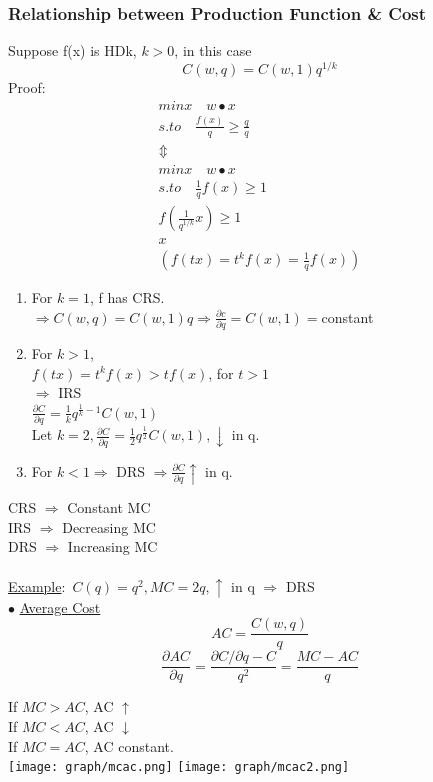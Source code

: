 \documentclass[letterpaper,13pt,single,pdftex]{scrartcl}
\begin{document}
\subsubsection{Relationship between Production Function \& Cost}
Suppose f(x) is HDk, $k>0$, in this case
\[C(w,q) = C(w,1)q^{1/k}\]
Proof:
\begin{gather*}
    min\limits{x}  \quad w\bullet x \\
    s.to\quad \frac{f(x)}{q} \ge \frac{q}{q}\\
    \Updownarrow\\
    min\limits{x}  \quad w\bullet x \\
    s.to \quad \frac{1}{q}f(x)\ge1\\
    f(\frac{1}{q^{1/k}}x)\ge1\\
    x\\
    (f(tx) = t^kf(x) = \frac{1}{q}f(x))
\end{gather*}
\begin{enumerate}
    \item For $k=1$, f has CRS. \\
    $\Rightarrow C(w,q) = C(w,1)q \Rightarrow \frac{\partial c}{\partial q} = C(w,1) = $constant
    \item For $k>1$, \\
    $f(tx) = t^kf(x) >tf(x)$, for $t>1$\\
    $\Rightarrow$ IRS\\
    $\frac{\partial C}{\partial q} = \frac{1}{k}q^{\frac{1}{k}-1} C(w,1)$\\
    Let $k =2, \frac{\partial C}{\partial q} = \frac{1}{2}q^{\frac{1}{2}}C(w,1), \downarrow$ in q.
    \item For $k<1\Rightarrow$ DRS $\Rightarrow \frac{\partial C}{\partial  q } \uparrow $ in q.\\
\end{enumerate}
CRS $\Rightarrow$ Constant MC\\
IRS $\Rightarrow$ Decreasing MC\\
DRS $\Rightarrow$ Increasing MC\\
\\
\underline{Example}:\, $C(q) = q^2, MC = 2q, \uparrow$ in q $\Rightarrow$ DRS\\

$\bullet$ \underline{Average Cost}\\
\[AC = \frac{C(w,q)}{q}\]
\[\frac{\partial AC}{\partial q} = \frac{\partial C/\partial q - C}{q^2} = \frac{MC -AC}{q}\]

If $MC > AC$, AC $\uparrow$\\
If $MC < AC$, AC $\downarrow$\\
If $MC = AC$, AC constant.\\
\texttt{[image: graph/mcac.png]}
\texttt{[image: graph/mcac2.png]}
\end{document}
